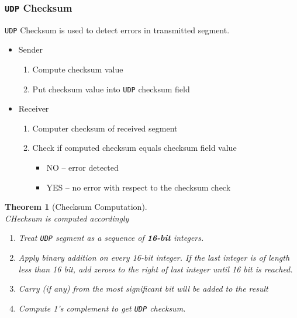 \documentclass[12pt]{article}
\newcommand\UDP{\texttt{UDP} }
\newtheorem{theorem}{Theorem}[section]
\theoremstyle{definition}
\begin{document}
\subsubsection{\UDP Checksum}
\UDP Checksum is used to detect errors in transmitted segment.\\
\begin{itemize}
  \item Sender
  \begin{enumerate}
    \item Compute checksum value
    \item Put checksum value into \UDP checksum field
  \end{enumerate}
  \item Receiver
  \begin{enumerate}
    \item Computer checksum of received segment
    \item Check if computed checksum equals checksum field value
    \begin{itemize}
      \item NO -- error detected
      \item YES -- no error with respect to the checksum check
    \end{itemize}
  \end{enumerate}
\end{itemize}
\begin{theorem}[Checksum Computation]
\hfill\\\normalfont CHecksum is computed accordingly
\begin{enumerate}
  \item Treat \UDP segment as a sequence of \textbf{16-bit} integers.
  \item Apply binary addition on every 16-bit integer. If the last integer is of length less than 16 bit, add zeroes to the right of last integer until 16 bit is reached.
  \item Carry (if any) from the most significant bit will be added to the result
  \item Compute 1's complement to get \UDP checksum.
\end{enumerate}
\end{theorem}
\end{document}
